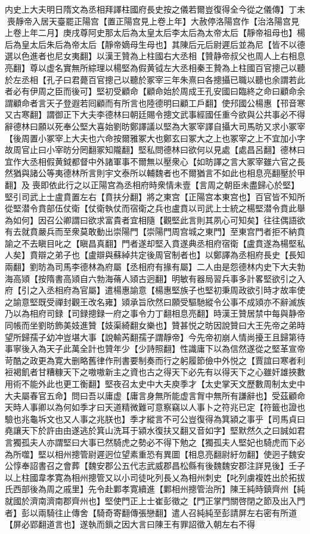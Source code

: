 内史上大夫明日隋文為丞相拜譯柱國府長史按之儀若爾豈復得全今從之儀傳】丁未喪靜帝入居天臺罷正陽宫【置正陽宫見上卷上年】大赦停洛陽宫作【治洛陽宫見上卷上年二月】庚戌尊阿史那太后為太皇太后李太后為太帝太后【靜帝祖母也】楊后為皇太后朱后為帝太后【靜帝嫡母生母也】其陳后元后尉遲后並為尼【皆不以德選以色進者也尼女夷翻】以漢王贊為上柱國右大丞相【贊静帝叔父也周人上右相息亮翻】尊以虚名實無所綜理以楊堅為假黄钺左大丞相秦王贄為上柱國百官摠己以聽於左丞相【孔子曰君薨百官摠己以聽於冢宰三年朱熹曰各摠攝已職以聽也余謂若此者必有伊周之臣而後可】堅初受顧命【顧命始於周成王孔安國曰臨終之命曰顧命余謂顧命者言天子登遐若囘顧而有所言也陸德明曰顧工戶翻】使䢴國公楊惠【邗音寒又古寒翻】謂御正下大夫李德林曰朝廷賜令摠文武事經國任重今欲與公共事必不得辭德林曰願以死奉公堅大喜始劉昉鄭譯議以堅為大冢宰譯自攝大司馬昉又求小冢宰【後周置小冢宰上大夫也六命按爾雅冢大也鄭玄曰冢大之上也冢宰之上不宜加小字故周官止曰小宰昉分罔翻冢知隴翻】堅私問德林曰欲何以見處【處昌呂翻】德林曰宜作大丞相假黄鉞都督中外諸軍事不爾無以壓衆心【如昉譯之言大冢宰雖六官之長然猶與諸公等夷德林所言則宇文泰所以輔魏者也不爾猶言不如此也相息亮翻壓於甲翻】及喪即依此行之以正陽宫為丞相府時衆情未壹【言周之朝臣未盡歸心於堅】堅引司武上士盧賁置左右【賁扶分翻】將之東宫【正陽宫本東宫也】百官皆不知所從堅潜令賁部伍仗衛【仗衛執仗而宿衛之兵也盧賁以司武上士統之楊堅潜令賁此舉為如何】因召公卿謂曰欲求富貴者宜相隨【觀堅此言則其夙心可知矣】往往偶語欲有去就賁嚴兵而至衆莫敢動出崇陽門【崇陽門周宫城之東門】至東宫門者拒不納賁諭之不去瞋目叱之【瞋昌真翻】門者遂却堅入賁遂典丞相府宿衛【盧賁遂為楊堅私人矣】賁辯之弟子也【盧辯與蘇綽共定後周官制者也】以鄭譯為丞相府長史【長知兩翻】劉昉為司馬李德林為府屬【丞相府有掾有屬】二人由是怨德林内史下大夫勃海高熲【按隋書高熲自六勃海蓨人熲古迥翻】明敏有器局習兵事多計畧堅欲引之入府【引之入丞相府為官屬】遣楊惠諭意【楊惠堅族子也堅初秉周政欲引時才故率使之諭意堅既受禪封觀王改名雍】熲承旨欣然曰願受驅馳縱令公事不成熲亦不辭滅族乃以為相府司録【司録摠録一府之事令力丁翻相息亮翻】時漢王贊居禁中每與静帝同帳而坐劉昉飾美妓進贊【妓渠綺翻女樂也】贊甚悦之昉因說贊曰大王先帝之弟時望所歸孺子幼冲豈堪大事【說輸芮翻孺子謂靜帝】今先帝初崩人情尚擾王且歸第待事寧後入為天子此萬全計也贊年少【少詩照翻】性識庸下以為信然遂從之堅革宣帝苛酷之政更為寛大删略舊律作刑書要制奏而行之躬履節儉中外悦之【賈誼曰寒者利裋褐飢者甘糟糠天下之嗷嗷新主之資也古之得天下必先有以得天下之心雖奸雄挾數用術不能外此也更工衡翻】堅夜召太史中大夫庾季才【太史掌天文歷數周制太史中大夫屬春官五命】問曰吾以庸虚【庸言身無所能虚言胷中無所有謙辭也】受茲顧命天時人事卿以為何如季才曰天道精微難可意察竊以人事卜之符兆已定【符籤也證也驗也兆龜坼文也又人事之兆朕也】季才縱言不可公豈復得為箕潁之事乎【司馬貞曰堯讓天下於許由由遂逃於箕山洗耳于潁水復扶又翻又音如字】堅默然久之曰誠如君言獨孤夫人亦謂堅曰大事已然騎虎之勢必不得下勉之【獨孤夫人堅妃也騎虎而下必為所噬】堅以相州摠管尉遲迥位望素重恐有異圖【相息亮翻尉紆勿翻】使迥子魏安公惇奉詔書召之會葬【魏安郡公五代志武威郡昌松縣有後魏魏安郡注詳見後】壬子以上柱國韋孝寛為相州摠管又以小司徒叱列長乂為相州刺史【叱列虜複姓出於拓拔氏西部後為周之戚里】先令赴鄴孝寛續進【鄴相州摠管治所】陳王純時鎮齊州【純就國於濟南濟南郡齊州也】堅使門正上士崔彭徵之【門正掌門關啓閉之節及出入門者】彭以兩騎往止傳舍【騎奇寄翻傳張戀翻】遣人召純純至彭請屏左右密有所道【屏必郢翻道言也】遂執而鎻之因大言曰陳王有罪詔徵入朝左右不得